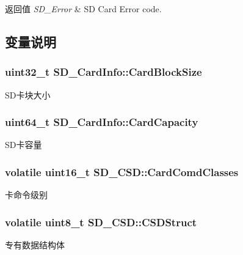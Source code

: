 \begin{DoxyRetVals}{返回值}
{\em S\+D\+\_\+\+Error} & SD Card Error code. \\
\hline
\end{DoxyRetVals}


\subsection{变量说明}
\subsubsection[{\texorpdfstring{Card\+Block\+Size}{CardBlockSize}}]{\setlength{\rightskip}{0pt plus 5cm}uint32\+\_\+t S\+D\+\_\+\+Card\+Info\+::\+Card\+Block\+Size}\hypertarget{group__sd__card_ga610fdab86929f0fc26881d564b19d609}{}\label{group__sd__card_ga610fdab86929f0fc26881d564b19d609}
S\+D卡块大小 
\subsubsection[{\texorpdfstring{Card\+Capacity}{CardCapacity}}]{\setlength{\rightskip}{0pt plus 5cm}uint64\+\_\+t S\+D\+\_\+\+Card\+Info\+::\+Card\+Capacity}\hypertarget{group__sd__card_ga536fbe580a6c824e73a2c3c4cf5b40c6}{}\label{group__sd__card_ga536fbe580a6c824e73a2c3c4cf5b40c6}
S\+D卡容量 
\subsubsection[{\texorpdfstring{Card\+Comd\+Classes}{CardComdClasses}}]{\setlength{\rightskip}{0pt plus 5cm}volatile uint16\+\_\+t S\+D\+\_\+\+C\+S\+D\+::\+Card\+Comd\+Classes}\hypertarget{group__sd__card_ga2777d2837a2db0a106ce0a915253f24d}{}\label{group__sd__card_ga2777d2837a2db0a106ce0a915253f24d}
卡命令级别 
\subsubsection[{\texorpdfstring{C\+S\+D\+Struct}{CSDStruct}}]{\setlength{\rightskip}{0pt plus 5cm}volatile uint8\+\_\+t S\+D\+\_\+\+C\+S\+D\+::\+C\+S\+D\+Struct}\hypertarget{group__sd__card_ga700c48bc2c031e2b002dd551a1af154c}{}\label{group__sd__card_ga700c48bc2c031e2b002dd551a1af154c}
专有数据结构体 
